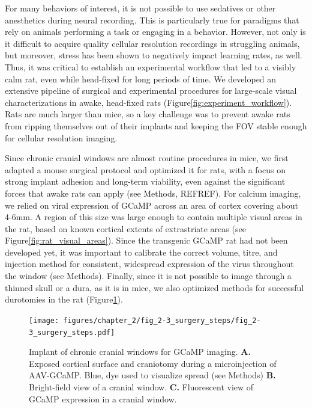 For many behaviors of interest, it is not possible to use sedatives or other anesthetics during neural recording. This is particularly true for paradigms that rely on animals performing a task or engaging in a behavior. However, not only is it difficult to acquire quality cellular resolution recordings in struggling animals, but moreover, stress has been shown to negatively impact learning rates, as well\cite{REFREF}. Thus, it was critical to establish an experimental workflow that led to a visibly calm rat, even while head-fixed for long periods of time. We developed an extensive pipeline of surgical and experimental procedures for large-scale visual characterizations in awake, head-fixed rats (Figure\ref{fig:experiment_workflow}). Rats are much larger than mice, so a key challenge was to prevent awake rats from ripping themselves out of their implants and keeping the FOV stable enough for cellular resolution imaging. 

Since chronic cranial windows are almost routine procedures in mice, we first adapted a mouse surgical protocol\cite{Goldey2014} and optimized it for rats, with a focus on strong implant adhesion and long-term viability, even against the significant forces that awake rats can apply (see Methods, REFREF). For calcium imaging, we relied on viral expression of GCaMP\cite{REFREF} across an area of cortex covering about 4-6mm. A region of this size was large enough to contain multiple visual areas in the rat, based on known cortical extents of extrastriate areas (see Figure\ref{fig:rat_visual_areas}). Since the transgenic GCaMP rat \cite{Scott2018ImagingMacroscope} had not been developed yet, it was important to calibrate the correct volume, titre, and injection method for consistent, widespread expression of the virus throughout the window (see Methods). Finally, since it is not possible to image through a thinned skull or a dura, as it is in mice, we also optimized methods for successful durotomies in the rat (Figure\ref{fig:surgery_steps}). 

\begin{figure}[t!]
    \texttt{[image: figures/chapter\_2/fig\_2-3\_surgery\_steps/fig\_2-3\_surgery\_steps.pdf]}
    \vspace{.1in}
    \caption[Chronic cranial window]{Implant of chronic cranial windows for GCaMP imaging. \textbf{A.} Exposed cortical surface and craniotomy during a microinjection of AAV-GCaMP. Blue, dye used to visualize spread (see Methods) \textbf{B.} Bright-field view of a cranial window. \textbf{C.} Fluorescent view of GCaMP expression in a cranial window.
    \label{fig:surgery_steps}}
\end{figure}

